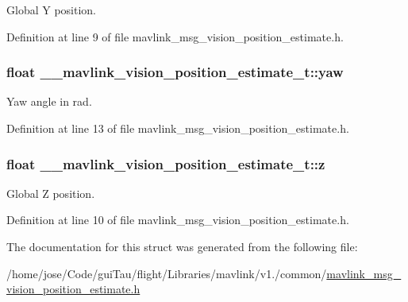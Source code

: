 Global Y position. 



Definition at line 9 of file mavlink\-\_\-msg\-\_\-vision\-\_\-position\-\_\-estimate.\-h.

\hypertarget{struct____mavlink__vision__position__estimate__t_a37749316a78f4f06f99fd36cd553f0a9}{
\subsubsection[{yaw}]{\setlength{\rightskip}{0pt plus 5cm}float \-\_\-\-\_\-mavlink\-\_\-vision\-\_\-position\-\_\-estimate\-\_\-t\-::yaw}}\label{struct____mavlink__vision__position__estimate__t_a37749316a78f4f06f99fd36cd553f0a9}


Yaw angle in rad. 



Definition at line 13 of file mavlink\-\_\-msg\-\_\-vision\-\_\-position\-\_\-estimate.\-h.

\hypertarget{struct____mavlink__vision__position__estimate__t_a930c0e377720e12a1413db5799d35caf}{
\subsubsection[{z}]{\setlength{\rightskip}{0pt plus 5cm}float \-\_\-\-\_\-mavlink\-\_\-vision\-\_\-position\-\_\-estimate\-\_\-t\-::z}}\label{struct____mavlink__vision__position__estimate__t_a930c0e377720e12a1413db5799d35caf}


Global Z position. 



Definition at line 10 of file mavlink\-\_\-msg\-\_\-vision\-\_\-position\-\_\-estimate.\-h.



The documentation for this struct was generated from the following file\-:\begin{DoxyCompactItemize}
\item 
/home/jose/\-Code/gui\-Tau/flight/\-Libraries/mavlink/v1./common/\hyperlink{mavlink__msg__vision__position__estimate_8h}{mavlink\-\_\-msg\-\_\-vision\-\_\-position\-\_\-estimate.\-h}\end{DoxyCompactItemize}
